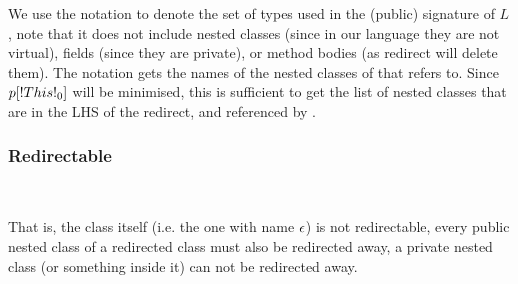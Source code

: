 \begin{defs}
	
\end{defs}

We use the notation  to denote the set of types used in the (public) signature of $L$, note that it does not include nested classes (since in our language they are not virtual),  fields (since they are private), or method bodies (as redirect will delete them). The notation  gets the names of the nested classes of  that \Tz refers to. Since $p[\This{0}]$ will be minimised, this is sufficient to get the list of nested classes that are in the LHS of the redirect, and referenced by \Tz.


\subsubsection{Redirectable}
\noindent\\ 

\begin{defs}
\end{defs}
That is, the class itself (i.e. the one with name $\epsilon$) is not redirectable, every public nested class of a redirected class must also be redirected away, a private nested class (or something inside it) can not be redirected away.

